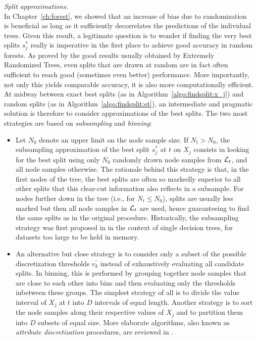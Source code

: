 \begin{description}
\item \textit{Split approximations.}\hfill\\
    In Chapter~\ref{ch:forest}, we showed that an increase of bias due to
    randomization is beneficial as long as it sufficiently decorrelates the
    predictions of the individual trees. Given this result, a legitimate
    question is to wonder if finding the very best splits $s^*_j$ really is
    imperative in the first place to achieve good accuracy in random forests. As proved by the
    good results usually obtained by Extremely Randomized Trees, even splits
    that are drawn at random are in fact often sufficient to reach good
    (sometimes even better) performance. More importantly, not only this yields
    comparable accuracy, it is also more computationally efficient. At midway
    between  exact best splits (as in Algorithm~\ref{algo:findsplit:x_j}) and
    random splits (as in Algorithm~\ref{algo:findsplit:et}), an intermediate
    and pragmatic solution is therefore to consider approximations of the best splits.
    The two most strategies are based on \textit{subsampling} and \textit{binning}:

    \begin{itemize}
    \item Let $N_0$ denote an upper limit on the node sample size. If $N_t > N_0$,
          the subsampling approximation of the best split $s^*_j$ at $t$ on $X_j$ consists
          in looking for the best split using only $N_0$ randomly drawn node
          samples from ${\cal L}_t$, and all node samples otherwise. The rationale behind this strategy is
          that, in the first nodes of the tree, the best splits are often
          so markedly superior to all other splits that this clear-cut information
          also reflects in a subsample. For nodes further down in the tree (i.e., for $N_t \leq N_0$),
          splits are usually less marked but then all node samples in ${\cal L}_t$
          are used, hence guaranteeing to find the same splits as in the original procedure.
          Historically, the subsampling strategy was first proposed in \citep{breiman:1984}
          in the context of single decision trees, for datasets too large to be held in memory.

    \item An alternative but close strategy is to consider only a subset
          of the possible discretization thresholds $v^\prime_k$ instead
          of exhaustively evaluating all candidate splits. In binning, this
          is performed by grouping together node samples that are close
          to each other into bins and then evaluating only the thresholds inbetween these groups.
          The simplest strategy of all is to divide the value interval of $X_j$
          at $t$ into $D$ intervals of equal length. Another strategy
          is to sort the node samples along their respective values of $X_j$
          and to partition them into $D$ subsets of equal size.
          More elaborate algorithms, also known as \textit{attribute discretization} procedures,
          are reviewed in \citep{zighed:2000}.
    \end{itemize}


\end{description}
